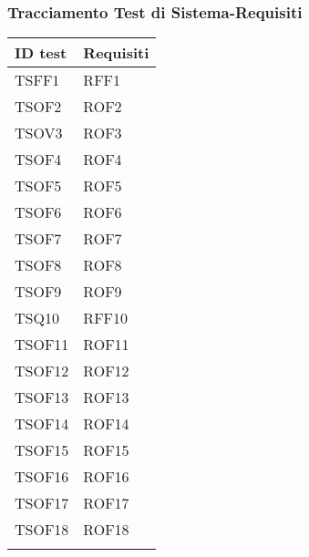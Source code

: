 \documentclass[../PianoDiQualifica_v3.0.0.tex]{subfiles}
\begin{document}
	\subsubsection{Tracciamento Test di Sistema-Requisiti}
	\begin{longtable}[c] { >{\centering\arraybackslash}p{3cm} >{\centering\arraybackslash}p{3cm}}
		\toprule
		\centerline{\textbf{ID test}} & \centerline{\textbf{Requisiti}} \\
			\midrule
			TSFF1 & RFF1 \\
			\addlinespace[0.3em]
			\midrule
			\addlinespace[0.3em]
			TSOF2 & ROF2 \\
			\addlinespace[0.3em]
			\midrule
			\addlinespace[0.3em]
			TSOV3 & ROF3 \\
			\addlinespace[0.3em]
			\midrule
			\addlinespace[0.3em]
			TSOF4 & ROF4 \\
			\addlinespace[0.3em]
			\midrule
			\addlinespace[0.3em]
			TSOF5 & ROF5 \\
			\addlinespace[0.3em]
			\midrule
			\addlinespace[0.3em]
			TSOF6 & ROF6 \\
			\addlinespace[0.3em]
			\midrule
			\addlinespace[0.3em]
			TSOF7 & ROF7 \\
			\addlinespace[0.3em]
			\midrule
			\addlinespace[0.3em]
			TSOF8 & ROF8 \\
			\addlinespace[0.3em]
			\midrule
			\addlinespace[0.3em]
			TSOF9 & ROF9 \\
			\addlinespace[0.3em]
			\midrule
			\addlinespace[0.3em]
			TSQ10 & RFF10 \\
			\addlinespace[0.3em]
			\midrule
			\addlinespace[0.3em]
			TSOF11 & ROF11 \\
			\addlinespace[0.3em]
			\midrule
			\addlinespace[0.3em]
			TSOF12 & ROF12 \\
			\addlinespace[0.3em]
			\midrule
			\addlinespace[0.3em]
			TSOF13 & ROF13 \\
			\addlinespace[0.3em]
			\midrule
			\addlinespace[0.3em]
			TSOF14 & ROF14 \\
			\addlinespace[0.3em]
			\midrule
			\addlinespace[0.3em]
			TSOF15 & ROF15 \\
			\addlinespace[0.3em]
			\midrule
			\addlinespace[0.3em]
			TSOF16 & ROF16 \\
			\addlinespace[0.3em]
			\midrule
			\addlinespace[0.3em]
			TSOF17 & ROF17 \\
			\addlinespace[0.3em]
			\midrule
			\addlinespace[0.3em]
			TSOF18 & ROF18 \\
			\addlinespace[0.3em]

\end{longtable}
\end{document}

